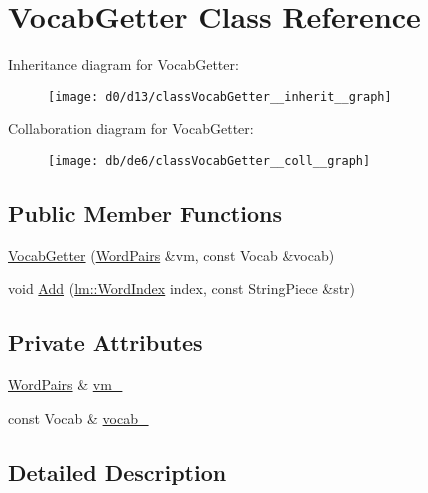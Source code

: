 \hypertarget{classVocabGetter}{}\section{Vocab\+Getter Class Reference}
\label{classVocabGetter}


Inheritance diagram for Vocab\+Getter\+:
\nopagebreak
\begin{figure}[H]
\begin{center}
\leavevmode
\texttt{[image: d0/d13/classVocabGetter\_\_inherit\_\_graph]}
\end{center}
\end{figure}


Collaboration diagram for Vocab\+Getter\+:
\nopagebreak
\begin{figure}[H]
\begin{center}
\leavevmode
\texttt{[image: db/de6/classVocabGetter\_\_coll\_\_graph]}
\end{center}
\end{figure}
\subsection*{Public Member Functions}
\begin{DoxyCompactItemize}
\item 
\hyperlink{classVocabGetter_a9e505a1f22a2e90792f2f68ec87c3be3}{Vocab\+Getter} (\hyperlink{kenlm_8h_ad28b93df55f44c282bedd86c1e041041}{Word\+Pairs} \&vm, const Vocab \&vocab)
\item 
void \hyperlink{classVocabGetter_aba275446f6729cd1d38571dc7fd6f796}{Add} (\hyperlink{namespacelm_aea554f766016a7141535a9f8f648766a}{lm\+::\+Word\+Index} index, const String\+Piece \&str)
\end{DoxyCompactItemize}
\subsection*{Private Attributes}
\begin{DoxyCompactItemize}
\item 
\hyperlink{kenlm_8h_ad28b93df55f44c282bedd86c1e041041}{Word\+Pairs} \& \hyperlink{classVocabGetter_a828337702247740d4802c9712523706d}{vm\+\_\+}
\item 
const Vocab \& \hyperlink{classVocabGetter_ae296f6ed2ee0ae8a6ddc8f5d079e4d0b}{vocab\+\_\+}
\end{DoxyCompactItemize}


\subsection{Detailed Description}


